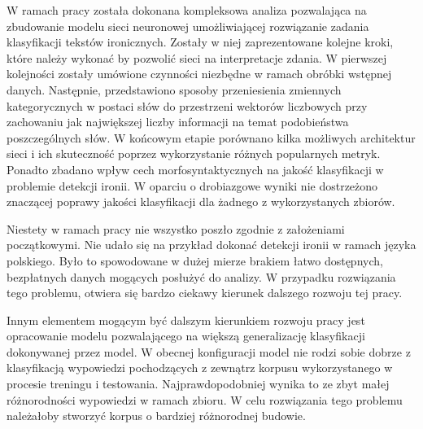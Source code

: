 
W ramach pracy została dokonana kompleksowa analiza pozwalająca na zbudowanie modelu sieci neuronowej umożliwiającej rozwiązanie zadania klasyfikacji tekstów ironicznych. Zostały w niej zaprezentowane kolejne kroki, które należy wykonać by pozwolić sieci na interpretacje zdania. W pierwszej kolejności zostały umówione czynności niezbędne w ramach obróbki wstępnej danych. Następnie, przedstawiono sposoby przeniesienia zmiennych kategorycznych w postaci słów do przestrzeni wektorów liczbowych przy zachowaniu jak największej liczby informacji na temat podobieństwa poszczególnych słów. W końcowym etapie porównano kilka możliwych architektur sieci i ich skuteczność poprzez wykorzystanie różnych popularnych metryk. Ponadto zbadano wpływ cech morfosyntaktycznych na jakość klasyfikacji w problemie detekcji ironii. W oparciu o drobiazgowe wyniki nie dostrzeżono znaczącej poprawy jakości klasyfikacji dla żadnego z wykorzystanych zbiorów. 

Niestety w ramach pracy nie wszystko poszło zgodnie z założeniami początkowymi. Nie udało się na przykład dokonać detekcji ironii w ramach języka polskiego. Było to spowodowane w dużej mierze brakiem łatwo dostępnych, bezpłatnych danych mogących posłużyć do analizy. W przypadku rozwiązania tego problemu, otwiera się bardzo ciekawy kierunek dalszego rozwoju tej pracy. 

Innym elementem mogącym być dalszym kierunkiem rozwoju pracy jest opracowanie modelu pozwalającego na większą generalizację klasyfikacji dokonywanej przez model. W obecnej konfiguracji model nie rodzi sobie dobrze z klasyfikacją wypowiedzi pochodzących z zewnątrz korpusu wykorzystanego w procesie treningu i testowania. Najprawdopodobniej wynika to ze zbyt małej różnorodności wypowiedzi w ramach zbioru. W celu rozwiązania tego problemu należałoby stworzyć korpus o bardziej różnorodnej budowie. 